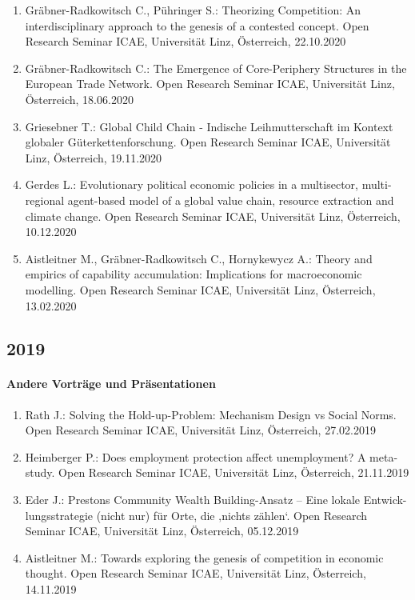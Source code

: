 \begin{enumerate}
	\item Gräbner-Radkowitsch C., Pühringer S.: Theorizing Competition: An interdisciplinary approach to the genesis of a contested concept. Open Research Seminar ICAE, Universität Linz, Österreich, 22.10.2020
	\item Gräbner-Radkowitsch C.: The Emergence of Core-Periphery Structures in the European Trade Network. Open Research Seminar ICAE, Universität Linz, Österreich, 18.06.2020
	\item Griesebner T.: Global Child Chain - Indische Leihmutterschaft im Kontext globaler Güterkettenforschung. Open Research Seminar ICAE, Universität Linz, Österreich, 19.11.2020
	\item Gerdes L.: Evolutionary political economic policies in a multisector, multi-regional agent-based model of a global value chain, resource extraction and climate change. Open Research Seminar ICAE, Universität Linz, Österreich, 10.12.2020
	\item Aistleitner M., Gräbner-Radkowitsch C., Hornykewycz A.: Theory and empirics of capability accumulation: Implications for macroeconomic modelling. Open Research Seminar ICAE, Universität Linz, Österreich, 13.02.2020
\end{enumerate}
\subsection*{2019}
\paragraph{Andere Vorträge und Präsentationen}
\begin{enumerate}
	\item Rath J.: Solving the Hold-up-Problem: Mechanism Design vs Social Norms. Open Research Seminar ICAE, Universität Linz, Österreich, 27.02.2019
	\item Heimberger P.: Does employment protection affect unemployment? A meta-study. Open Research Seminar ICAE, Universität Linz, Österreich, 21.11.2019
	\item Eder J.: Prestons Community Wealth Building-Ansatz – Eine lokale Entwick-lungsstrategie (nicht nur) für Orte, die ‚nichts zählen‘. Open Research Seminar ICAE, Universität Linz, Österreich, 05.12.2019
	\item Aistleitner M.: Towards exploring the genesis of competition in economic thought. Open Research Seminar ICAE, Universität Linz, Österreich, 14.11.2019
\end{enumerate}
